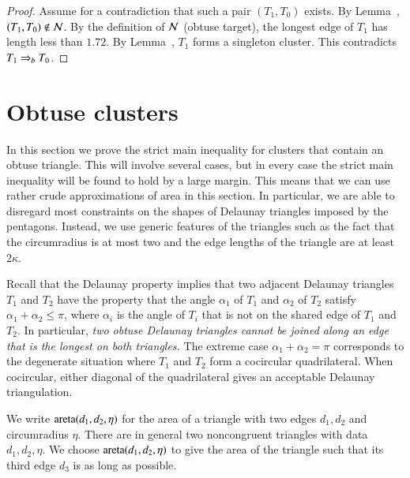 \begin{proof}  
  Assume for a contradiction that such a pair $(T_1,T_0)$ exists.  By
  Lemma~, $(T_1,T_0)\not\in\mathcal N$.  By the definition of
  $\mathcal N$ (obtuse target), the longest edge of $T_1$ has length less than
  $1.72$.  By Lemma~, $T_1$ forms a singleton
  cluster.  This contradicts $T_1\Rightarrow_{b} T_0$.
\end{proof}


\section{Obtuse clusters}

In this section we prove the strict main inequality for clusters that
contain an obtuse triangle.  This will involve several cases, but in
every case the strict main inequality will be found to hold by a large
margin.  This means that we can use rather crude approximations of
area in this section.  In particular, we are able to disregard most
constraints on the shapes of Delaunay triangles imposed by the
pentagons.  Instead, we use generic features of the triangles such as
the fact that the circumradius is at most two and the edge lengths of
the triangle are at least $2\kappa$.


\begin{remark}
  Recall that the Delaunay property implies that two adjacent Delaunay
  triangles $T_1$ and $T_2$ have the property that the angle
  $\alpha_1$ of $T_1$ and $\alpha_2$ of $T_2$ satisfy $\alpha_1 +
  \alpha_2\le \pi$, where $\alpha_i$ is the angle of $T_i$ that is not
  on the shared edge of $T_1$ and $T_2$.  In particular, {\it two
    obtuse Delaunay triangles cannot be joined along an edge that is
    the longest on both triangles.}  The extreme case
  $\alpha_1+\alpha_2=\pi$ corresponds to the degenerate situation
  where $T_1$ and $T_2$ form a cocircular quadrilateral. When
  cocircular, either diagonal of the quadrilateral gives an acceptable
  Delaunay triangulation.
\end{remark}



We write
${\operatorname{areta}}(d_1,d_2,\eta)$ for the area of a triangle with two edges
$d_1,d_2$ and circumradius $\eta$.  There are in general two
noncongruent triangles with data $d_1,d_2,\eta$.  We choose
${\operatorname{areta}}(d_1,d_2,\eta)$ to give the area of the triangle such that its
third edge $d_3$ is as long as possible.

